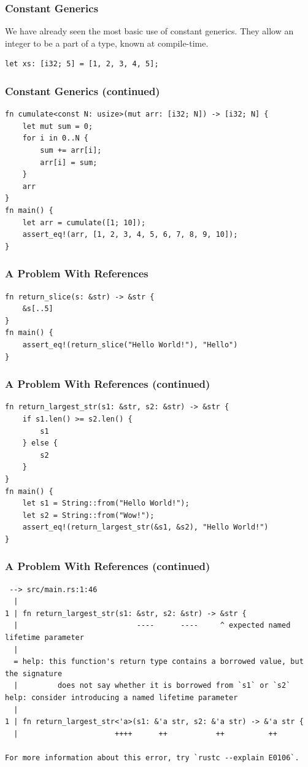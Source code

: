 \documentclass{slides}
\begin{document}
\begin{frame}[fragile]
\frametitle{Constant Generics}
We have already seen the most basic use of constant generics.
They allow an integer to be a part of a type, known at compile-time.

\begin{verbatim}
let xs: [i32; 5] = [1, 2, 3, 4, 5];
\end{verbatim}
\end{frame}

\begin{frame}[fragile]
\frametitle{Constant Generics (continued)}
\begin{verbatim}
fn cumulate<const N: usize>(mut arr: [i32; N]) -> [i32; N] {
    let mut sum = 0;
    for i in 0..N {
        sum += arr[i];
        arr[i] = sum;
    }
    arr
}
fn main() {
    let arr = cumulate([1; 10]);
    assert_eq!(arr, [1, 2, 3, 4, 5, 6, 7, 8, 9, 10]);
}
\end{verbatim}
\end{frame}

\begin{frame}[fragile]
\frametitle{A Problem With References}
\begin{verbatim}
fn return_slice(s: &str) -> &str {
    &s[..5]
}
fn main() {
    assert_eq!(return_slice("Hello World!"), "Hello")
}
\end{verbatim}
\end{frame}

\begin{frame}[fragile]
\frametitle{A Problem With References (continued)}
\begin{verbatim}
fn return_largest_str(s1: &str, s2: &str) -> &str {
    if s1.len() >= s2.len() {
        s1
    } else {
        s2
    }
}
fn main() {
    let s1 = String::from("Hello World!");
    let s2 = String::from("Wow!");
    assert_eq!(return_largest_str(&s1, &s2), "Hello World!")
}
\end{verbatim}
\end{frame}

\begin{frame}[fragile]
\frametitle{A Problem With References (continued)}
\begin{verbatim}
 --> src/main.rs:1:46
  |
1 | fn return_largest_str(s1: &str, s2: &str) -> &str {
  |                           ----      ----     ^ expected named lifetime parameter
  |
  = help: this function's return type contains a borrowed value, but the signature 
  |         does not say whether it is borrowed from `s1` or `s2`
help: consider introducing a named lifetime parameter
  |
1 | fn return_largest_str<'a>(s1: &'a str, s2: &'a str) -> &'a str {
  |                      ++++      ++           ++          ++

For more information about this error, try `rustc --explain E0106`.
\end{verbatim}
\end{frame}
\end{document}
